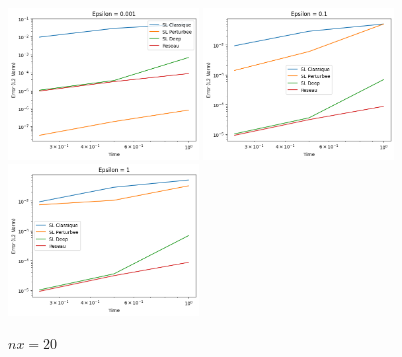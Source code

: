 \documentclass{article}
\begin{document}
\begin{figure}[!h]
    \centering
    \includegraphics[width=0.45\textwidth]{images/20ep13.png}
    \includegraphics[width=0.45\textwidth]{images/20ep14.png}
    \includegraphics[width=0.45\textwidth]{images/20ep15.png}
    \caption{$nx = 20$}
\end{figure}
\end{document}
